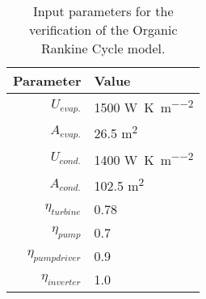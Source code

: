 \begin{table}%
	\centering
	\caption{Input parameters for the verification of the Organic Rankine Cycle model.}
	\label{tab:verification_ORC_params}
	\begin{tabular}{rl}
		\toprule
		           Parameter & Value                                        \\ \midrule
		         $U_{evap.}$ & 1500 \si{\watt\per\kelvin\per\meter\squared} \\
		         $A_{evap.}$ & 26.5 \si{\meter\squared}                     \\
		         $U_{cond.}$ & 1400 \si{\watt\per\kelvin\per\meter\squared} \\
		         $A_{cond.}$ & 102.5 \si{\meter\squared}                    \\
		    $\eta_{turbine}$ & 0.78                                         \\
		       $\eta_{pump}$ & 0.7                                          \\
		$\eta_{pump driver}$ & 0.9                                          \\
		   $\eta_{inverter}$ & 1.0                                          \\ \bottomrule
	\end{tabular}
\end{table}
